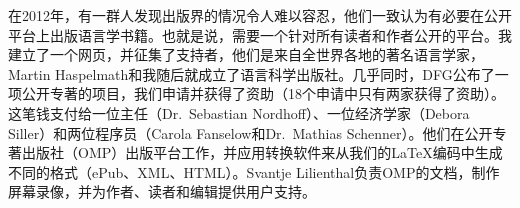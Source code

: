 




在2012年，有一群人发现出版界的情况令人难以容忍，他们一致认为有必要在公开平台上出版语言学书籍。也就是说，需要一个针对所有读者和作者公开的平台。我建立了一个网页，并征集了支持者，他们是来自全世界各地的著名语言学家，Martin Haspelmath和我随后就成立了语言科学出版社。几乎同时，DFG公布了一项公开专著的项目，我们申请\citep{MH2013a}并获得了资助（18个申请中只有两家获得了资助）。这笔钱支付给一位主任（Dr.\ Sebastian Nordhoff）、一位经济学家（Debora Siller）和两位程序员（Carola Fanselow和Dr.\ Mathias Schenner）。他们在公开专著出版社（OMP）出版平台工作，并应用转换软件来从我们的\LaTeX{}编码中生成不同的格式（ePub、XML、HTML）。Svantje Lilienthal负责OMP的文档，制作屏幕录像，并为作者、读者和编辑提供用户支持。

